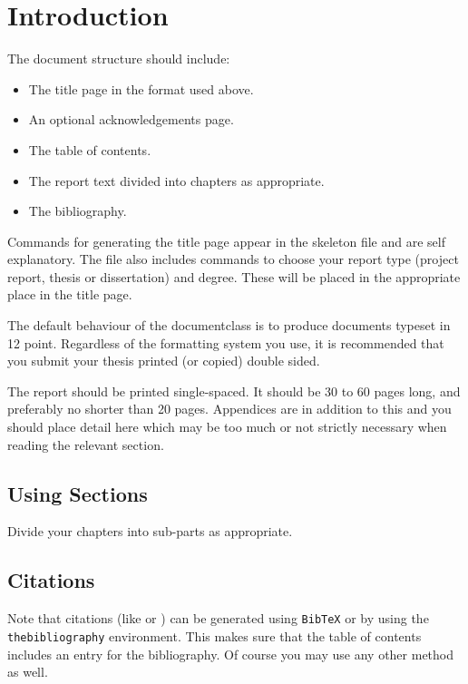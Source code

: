 \documentclass[bsc,frontabs,twoside,singlespacing,parskip,deptreport]{infthesis}
\begin{document}
\chapter{Introduction}{

  The document structure should include:
  \begin{itemize}
  \item
  The title page  in the format used above.
  \item
  An optional acknowledgements page.
  \item
  The table of contents.
  \item
  The report text divided into chapters as appropriate.
  \item
  The bibliography.
  \end{itemize}

  Commands for generating the title page appear in the skeleton file and
  are self explanatory.
  The file also includes commands to choose your report type (project
  report, thesis or dissertation) and degree.
  These will be placed in the appropriate place in the title page. 

  The default behaviour of the documentclass is to produce documents typeset in
  12 point.  Regardless of the formatting system you use, 
  it is recommended that you submit your thesis printed (or copied) 
  double sided.

  The report should be printed single-spaced.
  It should be 30 to 60 pages long, and preferably no shorter than 20 pages.
  Appendices are in addition to this and you should place detail
  here which may be too much or not strictly necessary when reading the relevant section.

  \section{Using Sections}{
    Divide your chapters into sub-parts as appropriate.
  }

  \section{Citations}{
    Note that citations 
    (like \cite{P1} or \cite{P2})
    can be generated using {\tt BibTeX} or by using the
    {\tt thebibliography} environment. This makes sure that the
    table of contents includes an entry for the bibliography.
    Of course you may use any other method as well.
  }

}
\end{document}
